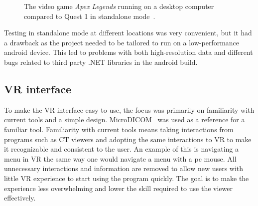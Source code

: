 \documentclass[a4paper]{report}
\begin{document}
\begin{figure}[h!]
    \centering

	\hfill
	\caption{The video game \emph{Apex Legends} running on a desktop computer compared to Quest 1 in standalone mode~\cite{tyriel_wood_-_vr_tech_oculus_2019}.}\label{comp}
  \small

\end{figure}
Testing in standalone mode at different locations was very convenient, but it had a drawback as the project needed to be tailored to run on a low-performance android device. This led to problems with both high-resolution data and different bugs related to third party .NET libraries in the android build.

\subsection{VR interface}

To make the VR interface easy to use, the focus was primarily on familiarity with current tools and a simple design.
MicroDICOM~\cite{noauthor_dicom_nodate-1} was used as a reference for a familiar tool.
Familiarity with current tools means taking interactions from programs such as CT viewers and adopting the same interactions to VR to make it recognizable and consistent to the user. An example of this is navigating a menu in VR the same way one would navigate a menu with a pc mouse.
 All unnecessary interactions and information are removed to allow new users with little VR experience to start using the program quickly. The goal is to make the experience less overwhelming and lower the skill required to use the viewer effectively.
\end{document}
